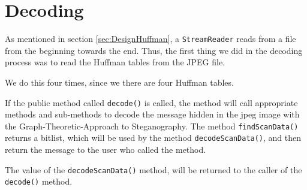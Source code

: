 \section{Decoding}
As mentioned in section \ref{sec:DesignHuffman}, a \lstinline|StreamReader| reads from a file from the beginning towards the end.
Thus, the first thing we did in the decoding process was to read the Huffman tables from the JPEG file. 

We do this four times, since we there are four Huffman tables.

If the public method called \lstinline|decode()| is called, the method will call appropriate methods and sub-methods to decode the message hidden in the jpeg image with the Graph-Theoretic-Approach to Steganography.
The method \lstinline|findScanData()| returns a bitlist, which will be used by the method \lstinline|decodeScanData()|, and then return the message to the user who called the method.


The value of the \lstinline|decodeScanData()| method, will be returned to the caller of the \lstinline|decode()| method.
